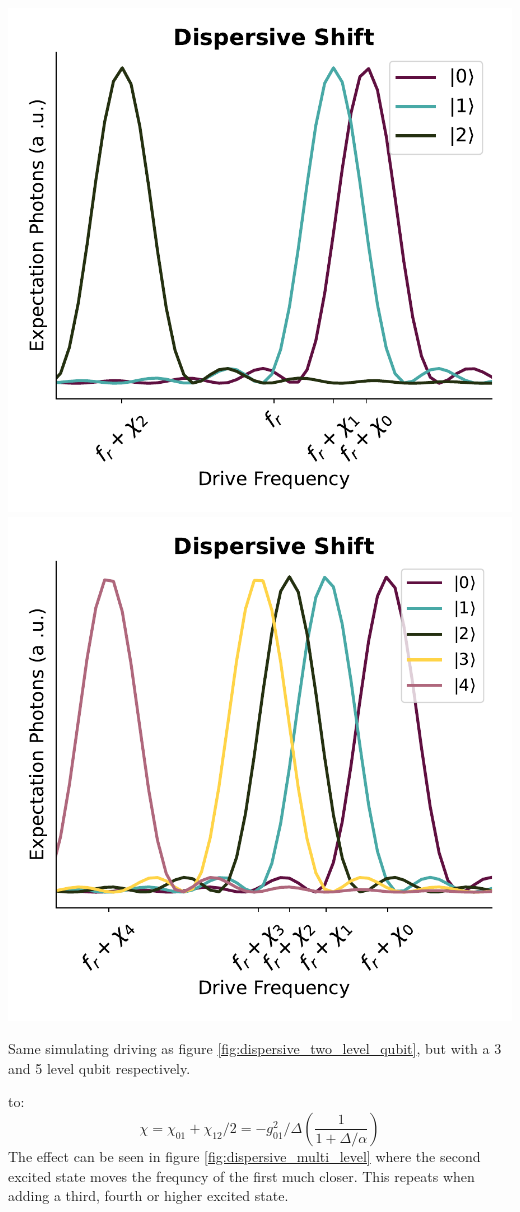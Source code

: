 \begin{marginfigure}
    \centering
    \includegraphics[]{Simulations/readout_simulations/dispersive_shift_3_level.pdf}
    \includegraphics[]{Simulations/readout_simulations/dispersive_shift_5_level.pdf}
    \caption{Same simulating driving as figure \ref{fig:dispersive_two_level_qubit}, but with a 3 and 5 level qubit respectively.}
    \label{fig:dispersive_multi_level}
\end{marginfigure}to\cite{krantz_quantum_2019}: 
\begin{equation}
    \chi = \chi_{01} + \chi_{12}/2 = - g_{01}^2/\Delta \left(\frac{1}{1 + \Delta / \alpha}\right)
\end{equation}
The effect can be seen in figure \ref{fig:dispersive_multi_level} where the second excited state moves the frequncy of the first much closer. This repeats when adding a third, fourth or higher excited state.

